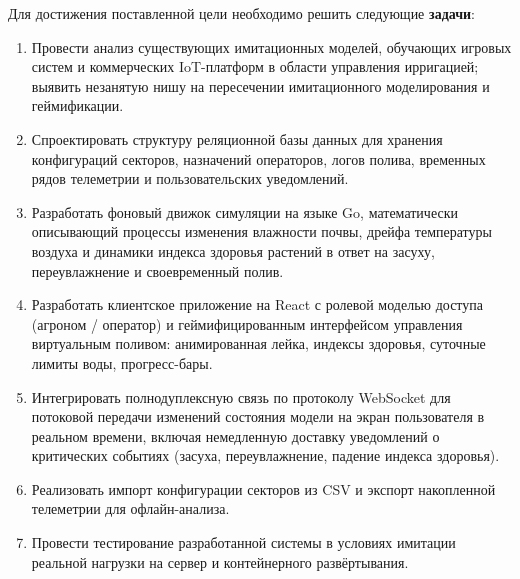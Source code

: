 Для достижения поставленной цели необходимо решить следующие
\textbf{задачи}:
\begin{enumerate}
	\item Провести анализ существующих имитационных моделей, обучающих
	игровых систем и коммерческих IoT-платформ в области
	управления ирригацией; выявить незанятую нишу на
	пересечении имитационного моделирования и геймификации.
	\item Спроектировать структуру реляционной базы данных для
	хранения конфигураций секторов, назначений операторов,
	логов полива, временных рядов телеметрии и
	пользовательских уведомлений.
	\item Разработать фоновый движок симуляции на языке Go,
	математически описывающий процессы изменения влажности
	почвы, дрейфа температуры воздуха и динамики индекса
	здоровья растений в ответ на засуху, переувлажнение и
	своевременный полив.
	\item Разработать клиентское приложение на React с ролевой
	моделью доступа (агроном / оператор) и геймифицированным
	интерфейсом управления виртуальным поливом: анимированная
	лейка, индексы здоровья, суточные лимиты воды,
	прогресс-бары.
	\item Интегрировать полнодуплексную связь по протоколу
	WebSocket для потоковой передачи изменений состояния
	модели на экран пользователя в реальном времени, включая
	немедленную доставку уведомлений о критических событиях
	(засуха, переувлажнение, падение индекса здоровья).
	\item Реализовать импорт конфигурации секторов из CSV и экспорт
	накопленной телеметрии для офлайн-анализа.
	\item Провести тестирование разработанной системы в условиях
	имитации реальной нагрузки на сервер и контейнерного
	развёртывания.
\end{enumerate}